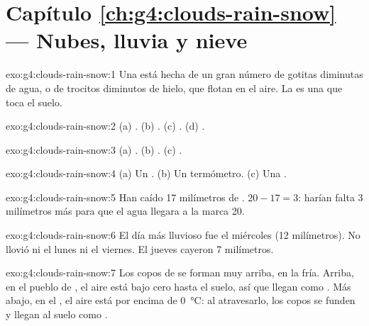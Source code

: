\section*{Capítulo \ref{ch:g4:clouds-rain-snow} --- Nubes, lluvia y nieve}

\begin{solution}{exo:g4:clouds-rain-snow:1}
Una  está hecha de un gran número de gotitas diminutas de agua, o de
trocitos diminutos de hielo, que flotan en el aire. La  es una 
que toca el suelo.
\end{solution}

\begin{solution}{exo:g4:clouds-rain-snow:2}
(a) . (b) . (c) . (d) .
\end{solution}

\begin{solution}{exo:g4:clouds-rain-snow:3}
(a) . (b) . (c) .
\end{solution}

\begin{solution}{exo:g4:clouds-rain-snow:4}
(a) Un . (b) Un termómetro. (c) Una .
\end{solution}

\begin{solution}{exo:g4:clouds-rain-snow:5}
Han caído 17 milímetros de . $20 - 17 = 3$: harían falta 3 milímetros
más para que el agua llegara a la marca 20.
\end{solution}

\begin{solution}{exo:g4:clouds-rain-snow:6}
El día más lluvioso fue el miércoles (12 milímetros). No llovió ni el lunes
ni el viernes. El jueves cayeron 7 milímetros.
\end{solution}

\begin{solution}{exo:g4:clouds-rain-snow:7}
Los copos de  se forman muy arriba, en la  fría. Arriba, en el
pueblo de , el aire está bajo cero hasta el suelo, así que llegan
como . Más abajo, en el , el aire está por encima de
\SI{0}{\celsius}: al atravesarlo, los copos se funden y llegan al suelo
como .
\end{solution}

